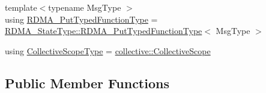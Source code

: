\begin{DoxyCompactItemize}
\item 
{\footnotesize template$<$typename Msg\+Type $>$ }\\using \hyperlink{structvt_1_1rdma_1_1_r_d_m_a_manager_ad9746ec3367968e16945ef88c1ac45ce}{R\+D\+M\+A\+\_\+\+Put\+Typed\+Function\+Type} = \hyperlink{structvt_1_1rdma_1_1_state_a3f76d1ccdab20ed3091e36d8fb9ecda5}{R\+D\+M\+A\+\_\+\+State\+Type\+::\+R\+D\+M\+A\+\_\+\+Put\+Typed\+Function\+Type}$<$ Msg\+Type $>$
\item 
using \hyperlink{structvt_1_1rdma_1_1_r_d_m_a_manager_ab2b109454390c41ea74e72a2850edd12}{Collective\+Scope\+Type} = \hyperlink{structvt_1_1collective_1_1_collective_scope}{collective\+::\+Collective\+Scope}
\end{DoxyCompactItemize}
\subsection*{Public Member Functions}

